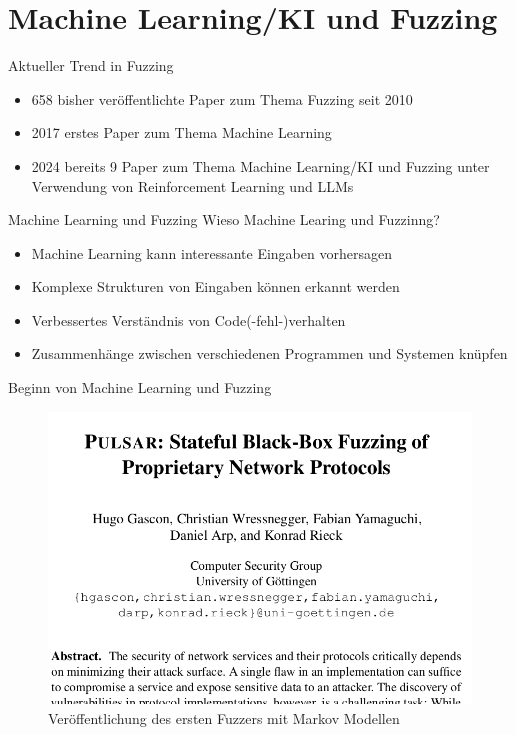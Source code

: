 
\section{Machine Learning/KI und Fuzzing}\label{sec:machine-learning-und-fuzzing}
\begin{frame}{Aktueller Trend in Fuzzing}
    \begin{itemize}
        \item 658 bisher veröffentlichte Paper zum Thema Fuzzing seit 2010~\cite{fuzzing-paper}
        \item 2017 erstes Paper zum Thema Machine Learning~\cite{godefroid2017learnfuzzmachinelearninginput}
        \item 2024 bereits 9 Paper zum Thema Machine Learning/KI und Fuzzing unter Verwendung von Reinforcement Learning und LLMs~\cite{fuzzing-paper}
    \end{itemize}
\end{frame}
\begin{frame}{Machine Learning und Fuzzing}
    Wieso Machine Learing und Fuzzinng?
    \begin{itemize}
        \item Machine Learning kann interessante Eingaben vorhersagen
        \item Komplexe Strukturen von Eingaben können erkannt werden
        \item Verbessertes Verständnis von Code(-fehl-)verhalten
        \item Zusammenhänge zwischen verschiedenen Programmen und Systemen knüpfen
    \end{itemize}
\end{frame}
\begin{frame}{Beginn von Machine Learning und Fuzzing}
    \begin{figure}[H]
        \centering
        \includegraphics[width=\textwidth]{res/pulsar}
        \caption[Pioniere des Fuzzing mit Machine Learning]{
            Veröffentlichung des ersten Fuzzers mit Markov Modellen~\cite{thuraisingham_pulsar_2015}
        }
        \label{fig:ml_fuzzing}
    \end{figure}
\end{frame}
